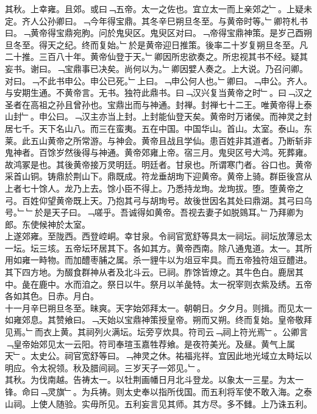 \documentclass{zhvt-classic}
\begin{document}
\hspace*{2em}其秋。上幸雍。且郊。或曰﹁五帝。太一之佐也。宜立太一而上亲郊之﹂。上疑未定。齐人公孙卿曰。﹁今年得宝鼎。其冬辛巳朔旦冬至。与黄帝时等。﹂卿符札书曰。﹁黄帝得宝鼎宛朐。问於鬼臾区。鬼臾区对曰。﹁帝得宝鼎神策。是岁己酉朔旦冬至。得天之纪。终而复始。﹂於是黄帝迎日推策。後率二十岁复朔旦冬至。凡二十推。三百八十年。黄帝仙登于天。﹂卿因所忠欲奏之。所忠视其书不经。疑其妄书。谢曰。﹁宝鼎事已决矣。尚何以为。﹂卿因嬖人奏之。上大说。乃召问卿。对曰。﹁不此书申公。申公已死。﹂上曰。﹁申公何人也。﹂卿曰。﹁申公。齐人。与安期生通。不黄帝言。无书。独符此鼎书。曰﹁汉兴复当黄帝之时﹂。曰﹁汉之圣者在高祖之孙且曾孙也。宝鼎出而与神通。封禅。封禅七十二王。唯黄帝得上泰山封﹂。申公曰。﹁汉主亦当上封。上封能仙登天矣。黄帝时万诸侯。而神灵之封居七千。天下名山八。而三在蛮夷。五在中国。中国华山。首山。太室。泰山。东莱。此五山黄帝之所常游。与神会。黄帝且战且学仙。患百姓非其道者。乃断斩非鬼神者。百馀岁然後得与神通。黄帝郊雍上帝。宿三月。鬼臾区号大鸿。死葬雍。故鸿冢是也。其後黄帝接万灵明廷。明廷者。甘泉也。所谓寒门者。谷口也。黄帝采首山铜。铸鼎於荆山下。鼎既成。符龙垂胡珣下迎黄帝。黄帝上骑。群臣後宫从上者七十馀人。龙乃上去。馀小臣不得上。乃悉持龙珣。龙珣拔。堕。堕黄帝之弓。百姓仰望黄帝既上天。乃抱其弓与胡珣号。故後世因名其处曰鼎湖。其弓曰乌号。﹂﹂於是天子曰。﹁嗟乎。吾诚得如黄帝。吾视去妻子如脱鵕耳。﹂乃拜卿为郎。东使候神於太室。\\
\hspace*{2em}上遂郊雍。至陇西。西登崆峒。幸甘泉。令祠官宽舒等具太一祠坛。祠坛放薄忌太一坛。坛三垓。五帝坛环居其下。各如其方。黄帝西南。除八通鬼道。太一。其所用如雍一畤物。而加醴枣脯之属。杀一貍牛以为俎豆牢具。而五帝独符俎豆醴进。其下四方地。为醊食群神从者及北斗云。已祠。胙馀皆燎之。其牛色白。鹿居其中。彘在鹿中。水而洎之。祭日以牛。祭月以羊彘特。太一祝宰则衣紫及绣。五帝各如其色。日赤。月白。\\
\hspace*{2em}十一月辛巳朔旦冬至。昧爽。天字始郊拜太一。朝朝日。夕夕月。则揖。而见太一如雍郊息。其赞飨曰。﹁天始以宝鼎神策授皇帝。朔而又朔。终而复始。皇帝敬拜见焉。﹂而衣上黄。其祠列火满坛。坛旁亨炊具。符司云﹁祠上符光焉﹂。公卿言﹁皇帝始郊见太一云阳。符司奉瑄玉嘉牲荐飨。是夜符美光。及昼。黄气上属天﹂。太史公。祠官宽舒等曰。﹁神灵之休。祐福兆祥。宜因此地光域立太畤坛以明应。令太祝领。秋及腊间祠。三岁天子一郊见。﹂。\\
\hspace*{2em}其秋。为伐南越。告祷太一。以牡荆画幡日月北斗登龙。以象太一三星。为太一锋。命曰﹁灵旗﹂。为兵祷。则太史奉以指所伐国。而五利将军使不敢入海。之泰山祠。上使人随验。实毋所见。五利妄言见其师。其方尽。多不雠。上乃诛五利。\\
\end{document}
